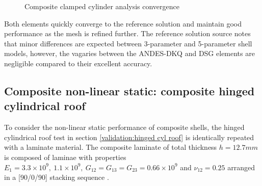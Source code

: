 \begin{figure}[H]
	\caption{\label{Composite_clamped_cylinder_test}Composite clamped cylinder analysis convergence}
\end{figure}

Both elements quickly converge to the reference solution and maintain good performance as the mesh is refined further. The reference solution source \cite{reddy2004mechanics} notes that minor differences are expected between 3-parameter and 5-parameter shell models, however, the vagaries between the ANDES-DKQ and DSG elements are negligible compared to their excellent accuracy.

\subsection{Composite non-linear static: composite hinged cylindrical roof}

To consider the non-linear static performance of composite shells, the hinged cylindrical roof test in section \ref{validation:hinged cyl roof} is identically repeated with a laminate material. The composite laminate of total thickness $h = 12.7mm$ is composed of laminae with properties $E_1 = 3.3\times10^9,\ 1.1\times10^9,\ G_{12} = G_{13} = G_{23} = 0.66\times10^9$ and $\nu_{12} = 0.25$ arranged in a [90/0/90] stacking sequence \cite{Sze2004}.

